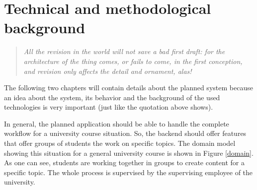 \chapter[Technical and methodological background]{Technical and methodological background}
\label{background}
  \begin{verse}
    \textit{All the revision in the world will not save a bad first draft: for the architecture of the thing comes, or fails to come, in the first conception, and revision only affects the detail and ornament, alas!}\\
  \end{verse}

The following two chapters will contain details about the planned system because an idea about the system, its behavior and the background of the used technologies is very important (just like the quotation above shows). 

In general, the planned application should be able to handle the complete workflow for a university course situation. So, the backend should offer features that offer groups of students the work on specific topics. The domain model showing this situation for a general university course is shown in Figure \ref{domain}. As one can see, students are working together in groups to create content for a specific topic. The whole process is supervised by the supervising employee of the university. 

